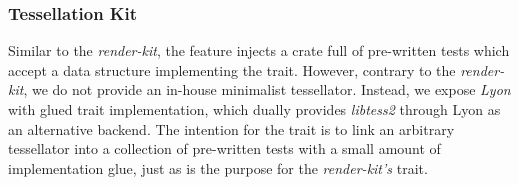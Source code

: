 \subsubsection{Tessellation Kit}
Similar to the \textit{render-kit}, the  feature injects a crate full of pre-written tests which accept a data structure implementing the  trait. However, contrary to the \textit{render-kit}, we do not provide an in-house minimalist tessellator. Instead, we expose \textit{Lyon}\cite{Lyon} with glued trait implementation, which dually provides \textit{libtess2} through Lyon as an alternative backend. The intention for the  trait is to link an arbitrary tessellator into a collection of pre-written tests with a small amount of implementation glue, just as is the purpose for the \textit{render-kit's}  trait.